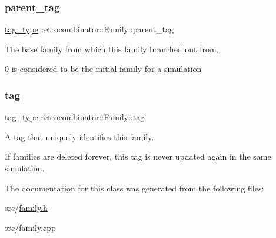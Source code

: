 \subsubsection{\texorpdfstring{parent\+\_\+tag}{parent\_tag}}
{\footnotesize\ttfamily \hyperlink{namespaceretrocombinator_afd7c6eb4293e8c4d12827609a9a34b9b}{tag\+\_\+type} retrocombinator\+::\+Family\+::parent\+\_\+tag\hspace{0.3cm}{\ttfamily [private]}}



The base family from which this family branched out from. 

0 is considered to be the initial family for a simulation \mbox{\label{classretrocombinator_1_1Family_a50f0b448e39c126db2c12bdcac5a488d}} 
\subsubsection{\texorpdfstring{tag}{tag}}
{\footnotesize\ttfamily \hyperlink{namespaceretrocombinator_afd7c6eb4293e8c4d12827609a9a34b9b}{tag\+\_\+type} retrocombinator\+::\+Family\+::tag\hspace{0.3cm}{\ttfamily [private]}}



A tag that uniquely identifies this family. 

If families are deleted forever, this tag is never updated again in the same simulation. 

The documentation for this class was generated from the following files\+:\begin{DoxyCompactItemize}
\item 
src/\hyperlink{family_8h}{family.\+h}\item 
src/family.\+cpp\end{DoxyCompactItemize}
